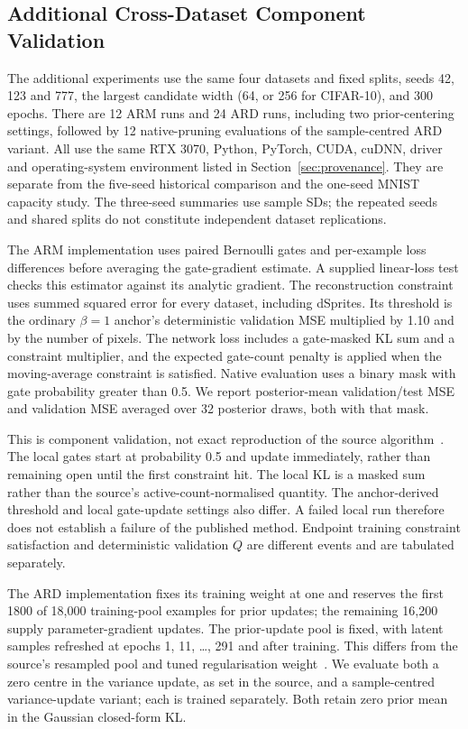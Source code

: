 \subsection{Additional Cross-Dataset Component Validation}\label{sec:gpuvalidation}
The additional experiments use the same four datasets and fixed splits,
seeds 42, 123 and 777, the largest candidate width (64, or 256 for
CIFAR-10), and 300 epochs. There are 12 ARM runs and 24 ARD runs,
including two prior-centering settings, followed by 12 native-pruning
evaluations of the sample-centred ARD variant. All use the same RTX 3070,
Python, PyTorch, CUDA, cuDNN, driver and operating-system environment
listed in Section~\ref{sec:provenance}. They are separate from the
five-seed historical comparison and the one-seed MNIST capacity study.
The three-seed summaries use sample SDs; the repeated seeds and shared
splits do not constitute independent dataset replications.

The ARM implementation uses paired Bernoulli gates and per-example
loss differences before averaging the gate-gradient estimate. A supplied
linear-loss test checks this estimator against its analytic gradient.
The reconstruction constraint uses summed squared error for every
dataset, including dSprites. Its threshold is the ordinary $\beta=1$
anchor's deterministic validation MSE multiplied by 1.10 and by the
number of pixels. The network loss includes a gate-masked KL sum and
a constraint multiplier, and the expected gate-count penalty is applied
when the moving-average constraint is satisfied. Native evaluation
uses a binary mask with gate probability greater than 0.5. We report
posterior-mean validation/test MSE and validation MSE averaged over
32 posterior draws, both with that mask.

This is component validation, not exact reproduction of the source
algorithm~\cite{deboom2020geco}. The local gates start at probability
0.5 and update immediately, rather than remaining open until the first
constraint hit. The local KL is a masked sum rather than the source's
active-count-normalised quantity. The anchor-derived threshold and
local gate-update settings also differ. A failed local run therefore
does not establish a failure of the published method. Endpoint training
constraint satisfaction and deterministic validation $Q$ are different
events and are tabulated separately.

The ARD implementation fixes its training weight at one and reserves
the first 1800 of 18,000 training-pool examples for prior updates; the
remaining 16,200 supply parameter-gradient updates. The prior-update
pool is fixed, with latent samples refreshed at epochs 1, 11, \ldots,
291 and after training. This differs from the source's resampled pool
and tuned regularisation weight~\cite{saha2025ardvae}. We evaluate both
a zero centre in the variance update, as set in the source, and a
sample-centred variance-update variant; each is trained separately.
Both retain zero prior mean in the Gaussian closed-form KL.

